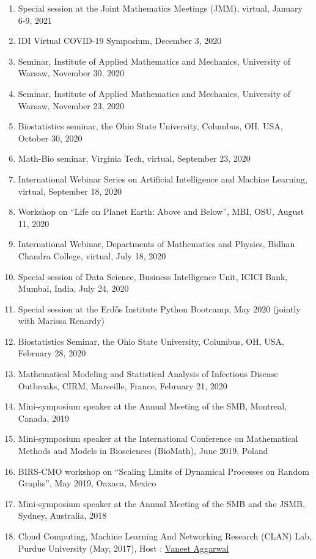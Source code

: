 \documentclass[11pt,a4paper,sans]{moderncv}        %
\begin{document}
\begin{enumerate}
	\item Special session at the Joint Mathematics Meetings (JMM), virtual, January 6-9, 2021
	\item IDI Virtual COVID-19 Symposium, December 3, 2020
	\item Seminar, Institute of Applied Mathematics and Mechanics, University of Warsaw, November 30, 2020
	\item Seminar, Institute of Applied Mathematics and Mechanics, University of Warsaw, November 23, 2020
	\item Biostatistics seminar, the Ohio State University, Columbus, OH, USA, October 30, 2020
	\item Math-Bio seminar, Virginia Tech, virtual, September 23, 2020
	\item International Webinar Series on Artificial Intelligence and Machine Learning, virtual, September 18, 2020 
	\item {Workshop on “Life on Planet Earth: Above and Below”, MBI, OSU, August 11, 2020}
	\item {International Webinar, Departments of Mathematics and Physics, Bidhan Chandra College, virtual, July 18, 2020}
	\item {Special session of Data Science, Business Intelligence Unit, ICICI Bank, Mumbai, India, July 24, 2020}
	\item {Special session at the Erd\H{o}s Institute Python Bootcamp, May 2020 (jointly with Marissa Renardy)}
	\item {Biostatistics Seminar, the Ohio State University, Columbus, OH, USA, February 28, 2020}
	\item {Mathematical Modeling and Statistical Analysis of Infectious Disease Outbreaks, CIRM, Marseille, France, February 21, 2020}
	\item {Mini-symposium speaker at the Annual Meeting of the SMB, Montreal, Canada, 2019}
	\item {Mini-symposium speaker at the International Conference on Mathematical Methods and Models in Biosciences (BioMath), June 2019, Poland}
	\item {BIRS-CMO workshop on ``Scaling Limits of Dynamical Processes on Random Graphs'', May 2019, Oaxaca, Mexico}
	\item {Mini-symposium speaker at the Annual Meeting of the SMB and the JSMB, Sydney, Australia, 2018}
	\item {Cloud Computing, Machine Learning And Networking Research (CLAN) Lab, Purdue University (May, 2017), Host : \href{http://web.ics.purdue.edu/~vaneet/}{Vaneet Aggarwal} }
\end{enumerate}
\end{document}
